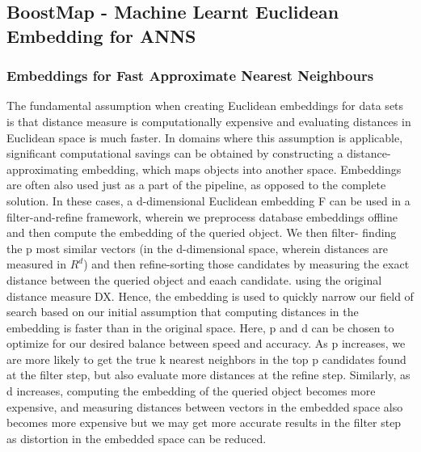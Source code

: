 \subsection{BoostMap - Machine Learnt Euclidean Embedding for ANNS}

\subsubsection{Embeddings for Fast Approximate Nearest Neighbours} %
The fundamental assumption when creating Euclidean embeddings for data sets is that distance measure is computationally expensive and evaluating distances in Euclidean space is much faster. \newline
In domains where this assumption is applicable, significant computational savings can be obtained by constructing a distance-approximating embedding, which maps objects into another space. \newline
Embeddings are often also used just as a part of the pipeline, as opposed to the complete solution. In these cases, a d-dimensional Euclidean embedding F can be used in a filter-and-refine framework, wherein we preprocess database embeddings offline and then compute the embedding of the queried object. We then filter- finding the p most similar vectors (in the d-dimensional space, wherein distances are measured in $R^d$) and then refine-sorting those candidates by measuring the exact distance between the queried object and eaach candidate. using the original distance measure DX. Hence, the embedding is used to quickly narrow our field of search based on our initial assumption that computing distances in the embedding is faster than in the original space. \newline
Here, p and d can be chosen to optimize for our desired balance between speed and accuracy. As p increases, we are more likely to get the true k nearest neighbors in the top p candidates found at the filter step, but also evaluate more distances at the refine step. Similarly, as d increases, computing the embedding of the queried object becomes more expensive, and measuring distances between vectors in the embedded space also becomes more expensive but we may get more accurate results in the filter step as distortion in the embedded space can be reduced. 

